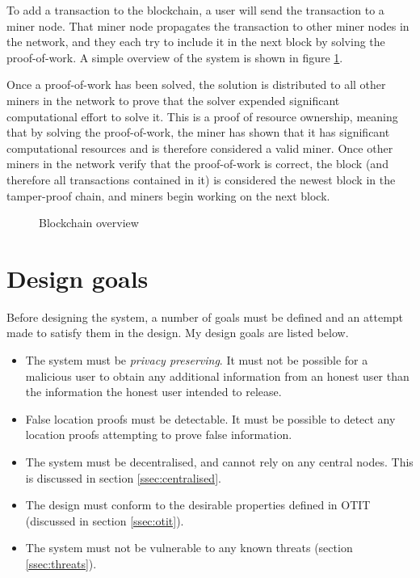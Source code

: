 To add a transaction to the blockchain, a user will send the transaction to a miner node. That miner node propagates the transaction to other miner nodes in the network, and they each try to include it in the next block by solving the proof-of-work. A simple overview of the system is shown in figure \ref{fig:blockchain}.

Once a proof-of-work has been solved, the solution is distributed to all other miners in the network to prove that the solver expended significant computational effort to solve it. This is a proof of resource ownership, meaning that by solving the proof-of-work, the miner has shown that it has significant computational resources and is therefore considered a valid miner. Once other miners in the network verify that the proof-of-work is correct, the block (and therefore all transactions contained in it) is considered the newest block in the tamper-proof chain, and miners begin working on the next block.

\begin{figure}[H]
\begin{center}

\end{center}
\caption{Blockchain overview}
\label{fig:blockchain}
\end{figure}

\section{Design goals}
Before designing the system, a number of goals must be defined and an attempt made to satisfy them in the design. My design goals are listed below.

\begin{itemize}
	\item The system must be \textit{privacy preserving}. It must not be possible for a malicious user to obtain any additional information from an honest user than the information the honest user intended to release.
	\item False location proofs must be detectable. It must be possible to detect any location proofs attempting to prove false information.
	\item The system must be decentralised, and cannot rely on any central nodes. This is discussed in section \ref{ssec:centralised}.
	\item The design must conform to the desirable properties defined in OTIT (discussed in section \ref{ssec:otit}).
	\item The system must not be vulnerable to any known threats (section \ref{ssec:threats}).
\end{itemize}

